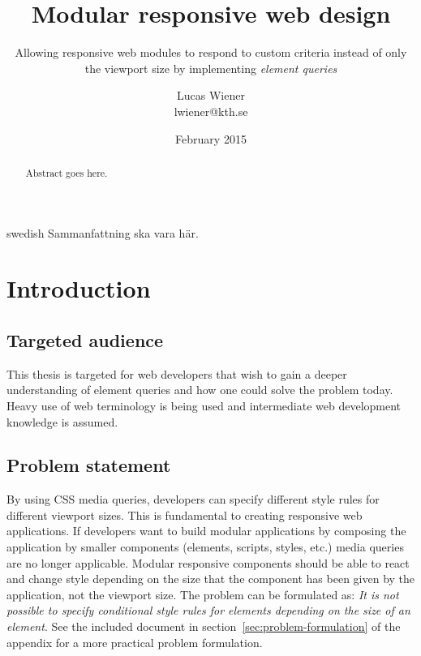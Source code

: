 \documentclass[a4paper,11pt]{kth-mag}
\title{Modular responsive web design}
\subtitle{Allowing responsive web modules to respond to custom criteria instead of only the viewport size by implementing \emph{element queries}}
\author{Lucas Wiener \\ \lowercase{lwiener@kth.se}}
\date{February 2015}
\begin{document}
  \frontmatter
  \pagestyle{empty}
  \removepagenumbers
  \maketitle
  \begin{abstract}
    Abstract goes here.
  \end{abstract}
  \clearpage
  \begin{foreignabstract}{swedish}
    Sammanfattning ska vara här.
  \end{foreignabstract}
  \clearpage
  \tableofcontents*
  \listoftodos
  \mainmatter
  \pagestyle{newchap}
  \chapter{Introduction}
    \section{Targeted audience}
      This thesis is targeted for \gls{web} developers that wish to gain a deeper understanding of element queries and how one could solve the problem today.
      Heavy use of \gls{web} terminology is being used and intermediate \gls{web} development knowledge is assumed.
    \section{Problem statement}
      By using \gls{CSS} \gls{media queries}, developers can specify different style rules for different \gls{viewport} sizes.
      This is fundamental to creating \gls{responsive} \gls{web} applications.
      If developers want to build modular applications by composing the application by smaller components (\glspl{element}, scripts, styles, etc.) \gls{media queries} are no longer applicable.
      Modular \gls{responsive} components should be able to react and change style depending on the size that the component has been given by the application, not the \gls{viewport} size.
      The problem can be formulated as: \emph{It is not possible to specify conditional style rules for \glspl{element} depending on the size of an element}.
      See the included document in section~\ref{sec:problem-formulation} of the appendix for a more practical problem formulation.
\end{document}
